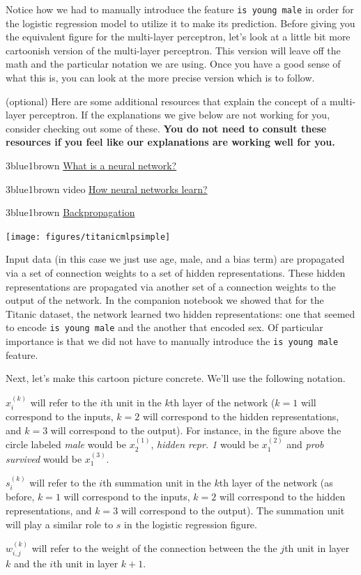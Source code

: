 \documentclass[assignment06_Solutions]{subfiles}
\begin{document}
Notice how we had to manually introduce the feature {\tt is young male} in order for the logistic regression model to utilize it to make its prediction.  Before giving you the equivalent figure for the multi-layer perceptron, let's look at a little bit more cartoonish version of the multi-layer perceptron.  This version will leave off the math and the particular notation we are using.  Once you have a good sense of what this is, you can look at the more precise version which is to follow.


\begin{externalresources}{(optional)}
Here are some additional resources that explain the concept of a multi-layer perceptron.  If the explanations we give below are not working for you, consider checking out some of these.  \textbf{You do not need to consult these resources if you feel like our explanations are working well for you.}
\bi
\item 3blue1brown \href{https://www.youtube.com/watch?v=aircAruvnKk&t=6s}{What is a neural network?} 
\item 3blue1brown video \href{https://www.youtube.com/watch?v=IHZwWFHWa-w&list=PL_h2yd2CGtBHEKwEH5iqTZH85wLS-eUzv&index=2}{How neural networks learn?}
\item 3blue1brown \href{https://www.youtube.com/watch?v=Ilg3gGewQ5U}{Backpropagation}
\ei
\end{externalresources}

\texttt{[image: figures/titanicmlpsimple]}

Input data (in this case we just use age, male, and a bias term) are propagated via a set of connection weights to a set of hidden representations.  These hidden representations are propagated via another set of a connection weights to the output of the network.   In the companion notebook we showed that for the Titanic dataset, the network learned two hidden representations: one that seemed to encode {\tt is young male} and the another that encoded sex.  Of particular importance is that we did not have to manually introduce the {\tt is young male} feature.

Next, let's make this cartoon picture concrete.  We'll use the following notation.
\bi
\item $x^{(k)}_i$ will refer to the $i$th unit in the $k$th layer of the network ($k=1$ will correspond to the inputs, $k=2$ will correspond to the hidden representations, and $k=3$ will correspond to the output).  For instance, in the figure above the circle labeled \emph{male} would be $x^{(1)}_2$, \emph{hidden repr. 1} would be $x^{(2)}_1$ and \emph{prob survived} would be $x^{(3)}_1$.
\item $s^{(k)}_i$ will refer to the $i$th summation unit in the $k$th layer of the network (as before, $k=1$ will correspond to the inputs, $k=2$ will correspond to the hidden representations, and $k=3$ will correspond to the output).  The summation unit will play a similar role to $s$ in the logistic regression figure.
\item $w^{(k)}_{i,j}$ will refer to the weight of the connection between the the $j$th unit in layer $k$ and the $i$th unit in layer $k+1$.
\ei
\end{document}
